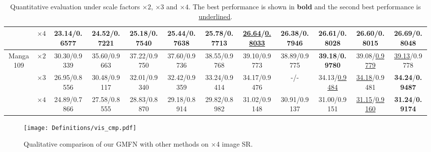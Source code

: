 \documentclass{bmvc2k}
\begin{document}
\begin{table*}[htbp]
{\begin{tabular}{|c|c|c|c|c|c|c|c|c|c|c|c|}
			                                        &       $\times4$        &       23.14/0.6577       &      24.52/0.7221       &      25.18/0.7540      &    25.44/0.7638     &  25.78/0.7713   & \underline{26.64}/\underline{0.8033} &       26.38/0.7946       &             26.61/0.8028             &             26.60/0.8015             &   \textbf {26.69}/\textbf{0.8048}    \\ \hline\hline
			       \multirow{3}{*}{Manga109}        &       $\times2$        &       30.30/0.9339       &      35.60/0.9663       &      37.22/0.9750      &    37.60/0.9736     &  38.55/0.9768   &            {39.10}/0.9773            &       38.89/0.9775       &    \textbf{39.18}/\textbf{0.9780}    &       39.08/\underline{0.9779}       &       \underline{39.13}/0.9778       \\
			                                        &       $\times3$        &       26.95/0.8556       &      30.48/0.9117       &      32.01/0.9340      &    32.42/0.9359     &  33.24/0.9414   &             34.17/0.9476             &           -/-            &       34.13/\underline{0.9484}       &       \underline{34.18}/0.9481       &    \textbf{34.24}/\textbf{0.9487}    \\
			                                        &       $\times4$        &       24.89/0.7866       &      27.58/0.8555       &      28.83/0.8870      &    29.18/0.8914     &  29.82/0.8982   &             31.02/0.9148             &       30.91/0.9137       &             31.00/0.9151             & \underline{31.15}/\underline{0.9160} &    \textbf{31.24}/\textbf{0.9174}    \\ \hline
		\end{tabular}}
		\vspace{-3mm}
		\caption{Quantitative evaluation under scale factors $\times 2$, $\times 3$ and $\times 4$. The best performance is shown in \textbf{bold} and the second best performance is \underline{underlined}.
			\label{comp_sot_bi}}
		\vspace{-3mm}
		
		
	\end{table*}

	\begin{figure}[H]
		\centering
		\texttt{[image: Definitions/vis\_cmp.pdf]}
		\vspace{-5mm}
		\caption{Qualitative comparison of our GMFN with other methods on $\times$4 image SR.}
		\label{fig:comp}
		\vspace{-4mm}
	\end{figure} 	
\end{document}
